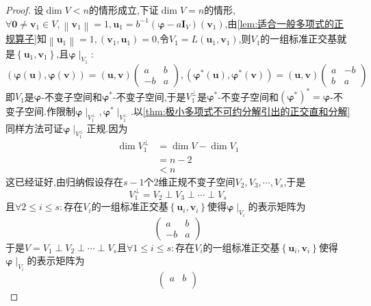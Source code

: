 {\begin{proof}
        设$\dim V<n$的情形成立,下证$\dim V=n$的情形,$\forall\bm{0}\neq\bm{v}_1\in V,\left\lVert\bm{v}_1\right\rVert=1,\bm{u}_1=b^{-1}\left(\bm{\varphi}-a\bm{I}_V\right)\left(\bm{v}_1\right)$,由\cref{lem:适合一般多项式的正规算子}知$\left\lVert\bm{u}_1\right\rVert=1,\left(
            \bm{v}_1,\bm{u}_1
            \right)=0$,令$V_1=L\left(\bm{u}_1,\bm{v}_1\right)$,则$V_1$的一组标准正交基就是$\left\{\bm{u}_1,\bm{v}_1\right\}$,且$\bm{\varphi}\mid_{V_1}:$\[
            \left(
            \bm{\varphi}\left(\bm{u}\right),\bm{\varphi}\left(\bm{v}\right)
            \right)=\left(\bm{u},\bm{v}\right)\begin{pmatrix}
                a  & b \\
                -b & a
            \end{pmatrix},\left(
            \bm{\varphi}^*\left(\bm{u}\right),\bm{\varphi}^*\left(\bm{v}\right)
            \right)=\left(\bm{u},\bm{v}\right)\begin{pmatrix}
                a & -b \\
                b & a
            \end{pmatrix}
        \]即$V_1$是$\bm{\varphi}$-不变子空间和$\bm{\varphi}^*$-不变子空间,于是$V_1^{\perp}$是$\bm{\varphi}^*$-不变子空间和$\left(\bm{\varphi}^*\right)^*= \bm{\varphi}$-不变子空间.作限制$\bm{\varphi}\mid_{V_1^{\perp}},\bm{\varphi}^*\mid_{V_1^{\perp}}$.以\cref{thm:极小多项式不可约分解引出的正交直和分解}同样方法可证$\bm{\varphi}\mid_{V_1^{\perp}}$正规.因为\begin{align*}
            \dim V_1^{\perp} & =\dim V-\dim V_1 \\
                             & =n-2             \\
                             & <n
        \end{align*}
        这已经证好,由归纳假设存在$s-1$个$2$维正规不变子空间$V_2,V_3,\cdots,V_s$,于是\[V_1^{\perp}=V_2\perp V_3\perp\cdots\perp V_s\]且$\forall2\leqslant i\leqslant s:$存在$V_i$的一组标准正交基$\left\{\bm{u}_i,\bm{v}_i\right\}$使得$\bm{\varphi}\mid_{V_i}$的表示矩阵为\[
            \begin{pmatrix}
                a  & b \\
                -b & a
            \end{pmatrix}
        \]于是$V=V_1\perp V_2\perp\cdots\perp V_s$且$\forall1\leqslant i\leqslant s:$存在$V_i$的一组标准正交基$\left\{\bm{u}_i,\bm{v}_i\right\}$使得$\bm{\varphi}\mid_{V_i}$的表示矩阵为\[
            \begin{pmatrix}
                a  & b \\

\end{pmatrix}\]
\end{proof}}
